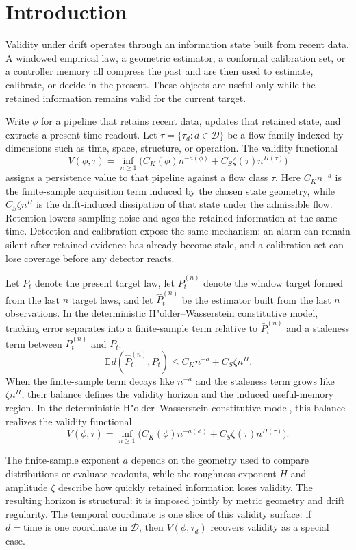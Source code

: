 \section{Introduction}\label{sec:intro}

Validity under drift operates through an information state built from recent data.
A windowed empirical law, a geometric estimator, a conformal calibration set, or
a controller memory all compress the past and are then used to estimate,
calibrate, or decide in the present. These objects are useful only while the
retained information remains valid for the current target.

Write $\phi$ for a pipeline that retains recent data, updates that retained
state, and extracts a present-time readout. Let $\tau=\{\tau_d:d\in\mathcal D\}$
be a flow family indexed by dimensions such as time, space, structure, or
operation. The validity functional
\[
  V(\phi,\tau)
  = \inf_{n\ge 1}\bigl(C_K(\phi)n^{-a(\phi)} + C_S\zeta(\tau)n^{H(\tau)}\bigr)
\]
assigns a persistence value to that pipeline against a flow class $\tau$.
Here $C_K n^{-a}$ is the finite-sample acquisition term induced by the chosen
state geometry, while $C_S\zeta n^H$ is the drift-induced dissipation of that
state under the admissible flow. Retention lowers sampling noise and ages the
retained information at the same time. Detection and calibration expose the same
mechanism: an alarm can remain silent after retained evidence has already become
stale, and a calibration set can lose coverage before any detector reacts.

Let $P_t$ denote the present target law, let $\bar P_t^{(n)}$ denote the window
target formed from the last $n$ target laws, and let $\widehat P_t^{(n)}$ be the
estimator built from the last $n$ observations. In the deterministic
H"older--Wasserstein constitutive model, tracking error separates into a
finite-sample term relative to $\bar P_t^{(n)}$ and a staleness term between
$\bar P_t^{(n)}$ and $P_t$:
\[
  \mathbb E\,d\!\left(\widehat P_t^{(n)},P_t\right)
  \le C_K n^{-a} + C_S\zeta n^H.
\]
When the finite-sample term decays like $n^{-a}$ and the staleness term grows
like $\zeta n^H$, their balance defines the validity horizon and the induced
useful-memory region. In the deterministic H"older--Wasserstein constitutive
model, this balance realizes the validity functional
\[
  V(\phi,\tau)=\inf_{n\ge 1}\bigl(C_K(\phi)n^{-a(\phi)}+C_S\zeta(\tau)n^{H(\tau)}\bigr).
\]

The finite-sample exponent $a$ depends on the geometry used to compare
distributions or evaluate readouts, while the roughness exponent $H$ and
amplitude $\zeta$ describe how quickly retained information loses validity.
The resulting horizon is structural: it is imposed jointly by metric geometry
and drift regularity. The temporal coordinate is one slice of this validity
surface: if $d=\mathrm{time}$ is one coordinate in $\mathcal D$, then
$V(\phi,\tau_d)$ recovers validity as a special case.

